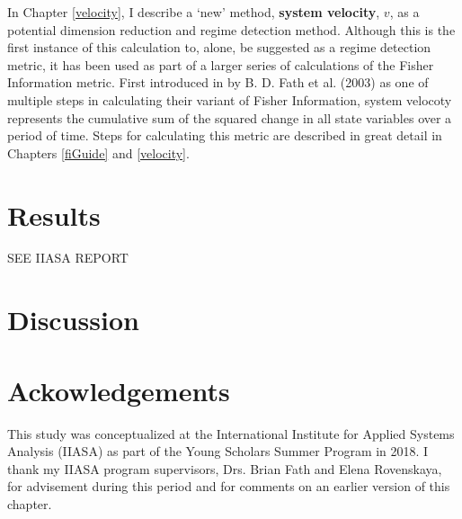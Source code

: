 \documentclass[12pt,twoside,openany]{reedthesis}
\begin{document}
In Chapter \ref{velocity}, I describe a `new' method, \textbf{system
velocity}, \(v\), as a potential dimension reduction and regime
detection method. Although this is the first instance of this
calculation to, alone, be suggested as a regime detection metric, it has
been used as part of a larger series of calculations of the Fisher
Information metric. First introduced in by B. D. Fath et al. (2003) as
one of multiple steps in calculating their variant of Fisher
Information, system velocoty represents the cumulative sum of the
squared change in all state variables over a period of time. Steps for
calculating this metric are described in great detail in Chapters
\ref{fiGuide} and \ref{velocity}.

\section{Results}\label{results-1}

SEE IIASA REPORT

\section{Discussion}\label{discussion-3}

\section{Ackowledgements}\label{ackowledgements}

This study was conceptualized at the International Institute for Applied
Systems Analysis (IIASA) as part of the Young Scholars Summer Program in
2018. I thank my IIASA program supervisors, Drs. Brian Fath and Elena
Rovenskaya, for advisement during this period and for comments on an
earlier version of this chapter.
\end{document}
